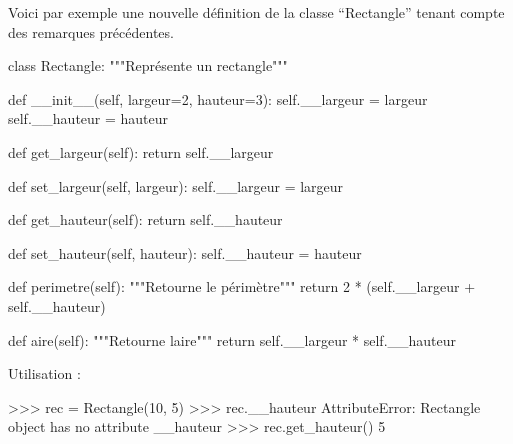 \documentclass[
  a4paper,
  DIV=11,
  numbers=noendperiod]{scrartcl}
\newenvironment{Shaded}{\begin{snugshade}}{\end{snugshade}}
\newcommand{\BuiltInTok}[1]{\textcolor[rgb]{0.00,0.23,0.31}{#1}}
\newcommand{\CommentTok}[1]{\textcolor[rgb]{0.37,0.37,0.37}{#1}}
\newcommand{\ControlFlowTok}[1]{\textcolor[rgb]{0.00,0.23,0.31}{#1}}
\newcommand{\DecValTok}[1]{\textcolor[rgb]{0.68,0.00,0.00}{#1}}
\newcommand{\FunctionTok}[1]{\textcolor[rgb]{0.28,0.35,0.67}{#1}}
\newcommand{\KeywordTok}[1]{\textcolor[rgb]{0.00,0.23,0.31}{#1}}
\newcommand{\NormalTok}[1]{\textcolor[rgb]{0.00,0.23,0.31}{#1}}
\newcommand{\OperatorTok}[1]{\textcolor[rgb]{0.37,0.37,0.37}{#1}}
\newcommand{\PreprocessorTok}[1]{\textcolor[rgb]{0.68,0.00,0.00}{#1}}
\newcommand{\StringTok}[1]{\textcolor[rgb]{0.13,0.47,0.30}{#1}}
\newcommand{\VariableTok}[1]{\textcolor[rgb]{0.07,0.07,0.07}{#1}}
\begin{document}
Voici par exemple une nouvelle définition de la classe ``Rectangle''
tenant compte des remarques précédentes.

\begin{Shaded}
\begin{Highlighting}[]
\KeywordTok{class}\NormalTok{ Rectangle:}
    \CommentTok{"""Représente un rectangle"""}

    \KeywordTok{def} \FunctionTok{\_\_init\_\_}\NormalTok{(}\VariableTok{self}\NormalTok{, largeur}\OperatorTok{=}\DecValTok{2}\NormalTok{, hauteur}\OperatorTok{=}\DecValTok{3}\NormalTok{):}
        \VariableTok{self}\NormalTok{.\_\_largeur }\OperatorTok{=}\NormalTok{ largeur}
        \VariableTok{self}\NormalTok{.\_\_hauteur }\OperatorTok{=}\NormalTok{ hauteur}

    \KeywordTok{def}\NormalTok{ get\_largeur(}\VariableTok{self}\NormalTok{):}
        \ControlFlowTok{return} \VariableTok{self}\NormalTok{.\_\_largeur}

    \KeywordTok{def}\NormalTok{ set\_largeur(}\VariableTok{self}\NormalTok{, largeur):}
        \VariableTok{self}\NormalTok{.\_\_largeur }\OperatorTok{=}\NormalTok{ largeur}

    \KeywordTok{def}\NormalTok{ get\_hauteur(}\VariableTok{self}\NormalTok{):}
        \ControlFlowTok{return} \VariableTok{self}\NormalTok{.\_\_hauteur}

    \KeywordTok{def}\NormalTok{ set\_hauteur(}\VariableTok{self}\NormalTok{, hauteur):}
        \VariableTok{self}\NormalTok{.\_\_hauteur }\OperatorTok{=}\NormalTok{ hauteur}

    \KeywordTok{def}\NormalTok{ perimetre(}\VariableTok{self}\NormalTok{):}
        \CommentTok{"""Retourne le périmètre"""}
        \ControlFlowTok{return} \DecValTok{2} \OperatorTok{*}\NormalTok{ (}\VariableTok{self}\NormalTok{.\_\_largeur }\OperatorTok{+} \VariableTok{self}\NormalTok{.\_\_hauteur)}

    \KeywordTok{def}\NormalTok{ aire(}\VariableTok{self}\NormalTok{):}
        \CommentTok{"""Retourne l\textquotesingle{}aire"""}
        \ControlFlowTok{return} \VariableTok{self}\NormalTok{.\_\_largeur }\OperatorTok{*} \VariableTok{self}\NormalTok{.\_\_hauteur}
\end{Highlighting}
\end{Shaded}

Utilisation :

\begin{Shaded}
\begin{Highlighting}[]
\OperatorTok{\textgreater{}\textgreater{}\textgreater{}}\NormalTok{ rec }\OperatorTok{=}\NormalTok{ Rectangle(}\DecValTok{10}\NormalTok{, }\DecValTok{5}\NormalTok{)}
\OperatorTok{\textgreater{}\textgreater{}\textgreater{}}\NormalTok{ rec.\_\_hauteur}
\PreprocessorTok{AttributeError}\NormalTok{: }\StringTok{\textquotesingle{}Rectangle\textquotesingle{}} \BuiltInTok{object}\NormalTok{ has no attribute }\StringTok{\textquotesingle{}\_\_hauteur\textquotesingle{}}
\OperatorTok{\textgreater{}\textgreater{}\textgreater{}}\NormalTok{ rec.get\_hauteur()}
\DecValTok{5}
\end{Highlighting}
\end{Shaded}
\end{document}
